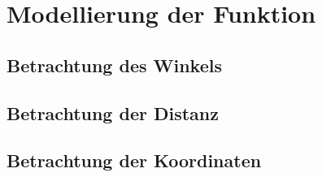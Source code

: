 \section{Modellierung der Funktion}
\label{mdf}
\subsection{Betrachtung des Winkels}
\subsection{Betrachtung der Distanz}
\subsection{Betrachtung der Koordinaten}